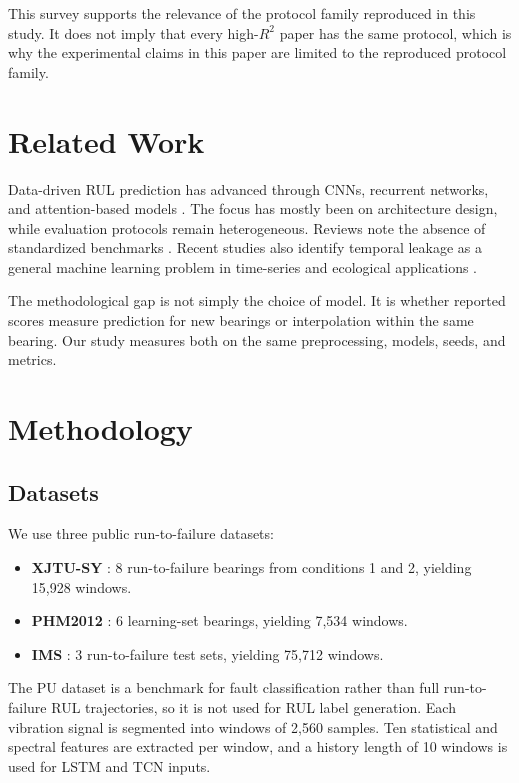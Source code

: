 \documentclass[5p,twocolumn]{elsarticle}
\begin{document}
This survey supports the relevance of the protocol family reproduced in this study. It does not imply that every high-$R^2$ paper has the same protocol, which is why the experimental claims in this paper are limited to the reproduced protocol family.

\section{Related Work}
Data-driven RUL prediction has advanced through CNNs, recurrent networks, and attention-based models \cite{li2020multiscale,zhang2020lstm,mo2022transformer}. The focus has mostly been on architecture design, while evaluation protocols remain heterogeneous. Reviews note the absence of standardized benchmarks \cite{zhao2021deep,caesarendra2021machine}. Recent studies also identify temporal leakage as a general machine learning problem in time-series and ecological applications \cite{leakage_nature,leakage_frontiers}.

The methodological gap is not simply the choice of model. It is whether reported scores measure prediction for new bearings or interpolation within the same bearing. Our study measures both on the same preprocessing, models, seeds, and metrics.

\section{Methodology}
\subsection{Datasets}
We use three public run-to-failure datasets:
\begin{itemize}
    \item \textbf{XJTU-SY} \cite{xjtusy2019dataset}: 8 run-to-failure bearings from conditions 1 and 2, yielding 15,928 windows.
    \item \textbf{PHM2012} \cite{nectoux2012pronostia}: 6 learning-set bearings, yielding 7,534 windows.
    \item \textbf{IMS} \cite{ims2006}: 3 run-to-failure test sets, yielding 75,712 windows.
\end{itemize}
The PU dataset is a benchmark for fault classification rather than full run-to-failure RUL trajectories, so it is not used for RUL label generation. Each vibration signal is segmented into windows of 2,560 samples. Ten statistical and spectral features are extracted per window, and a history length of 10 windows is used for LSTM and TCN inputs.
\end{document}
